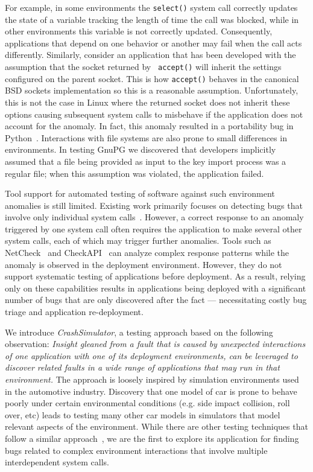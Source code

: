 For example, in some environments the {\tt select()} system call
correctly updates the state of a variable tracking the length of time
the call was blocked, while in other environments this variable is not
correctly updated.  Consequently, applications that depend on one
behavior or another may fail when the call acts
differently. Similarly, consider an application that has been
developed with the assumption that the socket returned by {\tt
  accept()} will inherit the settings configured on the parent socket.
This is how {\tt accept()} behaves in the canonical BSD sockets
implementation so this is a reasonable assumption.  Unfortunately,
this is not the case in Linux where the returned socket does not
inherit these options causing subsequent system calls to misbehave if
the application does not account for the anomaly. In fact, this
anomaly resulted in a portability bug in
Python~\cite{Zhuang_NSDI_2014}.  Interactions with file systems are
also prone to small differences in environments.  In testing GnuPG we
discovered that developers implicitly assumed that a file being
provided as input to the key import process was a regular file; when
this assumption was violated, the application failed.

Tool support for automated testing of software against such
environment anomalies is still limited. Existing work primarily
focuses on detecting bugs that involve only individual system
calls~\cite{Koopman00theexception,Dadeau:2008:CSM:1433121.1433137,Farchi02}. However,
a correct response to an anomaly triggered by one
system call often requires the application to make several other
system calls, each of which may trigger further anomalies. Tools such
as NetCheck~\cite{Zhuang_NSDI_2014} and
CheckAPI~\cite{rasley2015detecting} can analyze complex response
patterns while the anomaly is observed in the deployment
environment. However, they do not support systematic testing of
applications before deployment.  As a result, relying only on these
capabilities results in applications being deployed
with a significant number of bugs that are only discovered after the fact
--- necessitating costly bug triage and application re-deployment.

We introduce {\em CrashSimulator}, a testing approach based on the
following observation: {\em Insight gleaned from a fault that is
  caused by unexpected interactions of {\em one application} with one
  of its deployment environments, can be leveraged to discover related
  faults in a {\em wide range} of applications that may run in that
  environment.}  The approach is loosely inspired by simulation
environments used in the automotive industry. Discovery that one model
of car is prone to behave poorly under certain environmental
conditions (e.g. side impact collision, roll over, etc) leads to
testing many other car models in simulators that model relevant
aspects of the environment. While there are other testing techniques
that follow a similar approach~\cite{mariani2007compatibility,
  DBLP:journals/ase/WasylkowskiZ11, DBLP:conf/icse/PradelJAG12,
  DBLP:journals/tosem/MonperrusM13,
  DBLP:conf/icse/JamrozikSZ16}, we are the first to explore
its application for finding bugs related to complex environment
interactions that involve multiple interdependent system calls.

